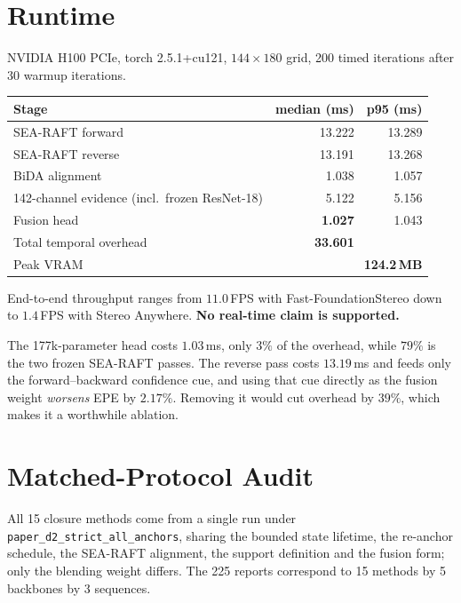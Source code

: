 \documentclass[11pt,a4paper]{article}
\begin{document}
\section*{Runtime}

NVIDIA H100 PCIe, torch 2.5.1+cu121, $144 \times 180$ grid, 200 timed
iterations after 30 warmup iterations.

\begin{center}
\begin{tabular}{lrr}
\toprule
Stage & median (ms) & p95 (ms) \\
\midrule
SEA-RAFT forward & 13.222 & 13.289 \\
SEA-RAFT reverse & 13.191 & 13.268 \\
BiDA alignment   & 1.038  & 1.057 \\
142-channel evidence (incl.\ frozen ResNet-18) & 5.122 & 5.156 \\
Fusion head      & \textbf{1.027} & 1.043 \\
\midrule
Total temporal overhead & \textbf{33.601} & \\
Peak VRAM & \multicolumn{2}{r}{\textbf{124.2\,MB}} \\
\bottomrule
\end{tabular}
\end{center}

End-to-end throughput ranges from $11.0$\,FPS with
Fast-FoundationStereo down to $1.4$\,FPS with Stereo Anywhere.
\textbf{No real-time claim is supported.}

The 177k-parameter head costs $1.03$\,ms, only $3\%$ of the overhead,
while $79\%$ is the two frozen SEA-RAFT passes. The reverse pass costs
$13.19$\,ms and feeds only the forward--backward confidence cue, and
using that cue directly as the fusion weight \emph{worsens} EPE by
$2.17\%$. Removing it would cut overhead by $39\%$, which makes it a
worthwhile ablation.

\section*{Matched-Protocol Audit}

All 15 closure methods come from a single run under
\texttt{paper\_d2\_strict\_all\_anchors}, sharing the bounded state
lifetime, the re-anchor schedule, the SEA-RAFT alignment, the support
definition and the fusion form; only the blending weight differs. The
225 reports correspond to 15 methods by 5 backbones by 3 sequences.
\end{document}
